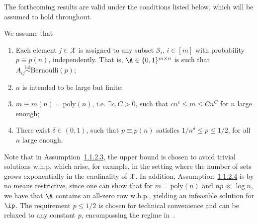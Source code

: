 The forthcoming results are valid under the conditions listed below, which will be assumed to hold throughout.
\begin{assumption}\label{asmpt:A_np_m}We assume that

\begin{enumerate}
    \item Each element $j\in \mathcal{X}$ is assigned to any subset $\mathcal{S}_i$, $i \in [m]$ with probability $p \equiv p(n)$, independently. That is, $\A \in \{0, 1\}^{m \times n}$ is such that $A_{ij} \overset{\text{iid}}{\sim} \mathrm{Bernoulli}(p)$; 
    \item $n$ is intended to be large but finite;
    \item \label{asmpt:A_np_m.c} \(m \equiv m(n) = \mathrm{poly}(n)\), i.e. $\exists c, C > 0$, such that $c n^c \leq m \leq Cn^C$ for $n$ large enough; 
    \item 
\label{asmpt:A_np_m.d} There exist $\delta \in (0,1)$, such that \(p \equiv p(n)\) satisfies \(1/n^{\delta} \leq p \leq 1/2\), for all \(n\) large enough.
\end{enumerate}
\end{assumption}

\noindent
Note that in Assumption~\hyperref[asmpt:A_np_m.c]{1.1.2.3}, the upper bound is chosen to avoid trivial solutions w.h.p. which arise, for example, in the setting where the number of sets grows exponentially in the cardinality of $\mathcal{X}$.  
In addition, Assumption~\hyperref[asmpt:A_np_m.d]{1.1.2.4} is by no means restrictive, since one can show that for $m = \text{poly}(n)$ and \(np \ll \log n\), we have that $\A$ contains an all-zero row w.h.p., yielding an infeasible solution for $\ip$. 
The requirement \(p \leq 1/2\) is chosen for technical convenience and can be relaxed to any constant \(p\), encompassing the regime in~\cite{iliopoulos2021group}.\\

